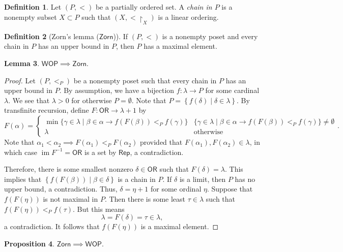 \documentclass[10pt,letterpaper,cm]{nupset}
\theoremstyle{definition}
\newtheorem{definition}{Definition}[subsection]
\theoremstyle{theorem}
\newtheorem{lemma}[definition]{Lemma}
\newtheorem{prop}[definition]{Proposition}
\theoremstyle{remark}
\newcommand{\1}{\mathbf{1}}
\newcommand{\0}{\vec 0}
\newcommand{\ord}{\mathsf{OR}}
\DeclareMathOperator{\im}{im}
\begin{document}
\begin{definition}
Let $\left(P, <\right)$ be a partially ordered set. A \textit{chain in $P$} is a nonempty subset $X\subset P$ such that $\left(X, <\restriction_X\right)$ is a linear ordering. 
\end{definition}

\begin{definition}[Zorn's lemma ($\mathsf{Zorn}$)]
If $\left(P, <\right)$ is a nonempty poset and every chain in $P$ has an upper bound in $P$, then $P$ has a maximal element. 
\end{definition}

\begin{lemma}
$\mathsf{WOP} \implies \mathsf{Zorn}$.
\end{lemma}
\begin{proof} Let $\left(P, <_P\right)$ be a nonempty poset such that every chain in $P$ has an upper bound in $P$. By assumption, we have a bijection $f : \lambda \to P$ for some cardinal $\lambda$. We see that $\lambda >0$ for otherwise $P = \emptyset$. Note that $P = \left\{f(\delta) \mid \delta \in \lambda\right\}$. By transfinite recursion, define $F: \ord \to \lambda +1$ by
\[
F(\alpha) = \begin{cases}
\min\{\gamma \in \lambda \mid \beta \in \alpha \rightarrow f(F(\beta)) <_P f(\gamma)\} &\{\gamma \in \lambda \mid \beta \in \alpha \rightarrow f(F(\beta)) <_P f(\gamma)\} \ne \emptyset
\\ \lambda & \text{otherwise}
\end{cases}.
\]  Note that $\alpha_1 < \alpha _2 \implies F(\alpha_1) <_P F(\alpha_2)$ provided that $ F(\alpha_1),  F(\alpha_2) \in \lambda$, in which case $\im{F^{-1}}= \ord$ is a set by $\mathsf{Rep}$, a contradiction. 

\smallskip
Therefore, there is some smallest nonzero $\delta \in \ord$ such that $F(\delta) = \lambda$. This implies that $\left\{f(F(\beta)) \mid \beta \in \delta\right\}$ is a chain in $P$. If $\delta$ is a limit, then $P$ has no upper bound, a contradiction. Thus, $\delta = \eta + 1$ for some ordinal $\eta$. Suppose that $f(F(\eta))$ is not maximal in $P$. Then there is some least $\tau \in \lambda$ such that $f(F(\eta)) <_P f(\tau)$. But this means $$\lambda = F(\delta) = \tau \in \lambda,$$ a contradiction. It follows that $f(F(\eta))$ is a maximal element.  
\end{proof}

\begin{prop}
$\mathsf{Zorn} \implies \mathsf{WOP}$.
\end{prop}
\end{document}
